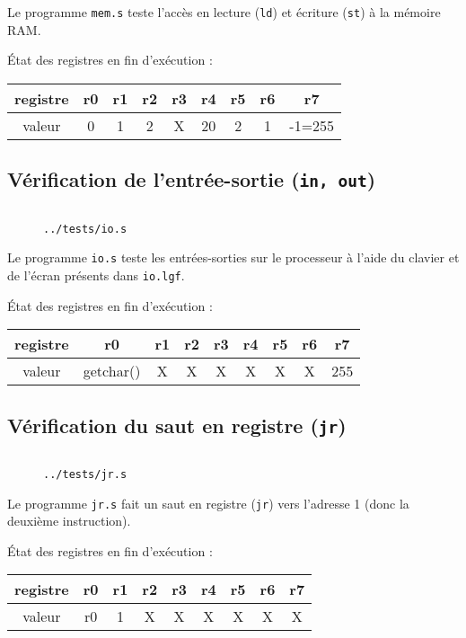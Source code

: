 \documentclass[twoside, 12pt, a4paper]{article}
\newcommand{\fm}[2]{
\begin{figure}[!h]
    \centering
    \inputminted[]{asm}{#1}
    \caption{\texttt{#2}}
\end{figure}
}
\begin{document}
Le programme \texttt{mem.s} teste l'accès en lecture (\texttt{ld}) et écriture (\texttt{st}) à la mémoire RAM.

État des registres en fin d'exécution :
\begin{center}
    \ttfamily
        \begin{tabular}{|c|c|c|c|c|c|c|c|c|} 
         \hline
         registre & r0 & r1 & r2 & r3 & r4 & r5 & r6 & r7 \\
         \hline
         valeur   & 0  & 1  & 2  &  X & 20 & 2 &  1  & -1=255\\
         \hline
    \end{tabular}
\end{center}

\subsection{Vérification de l'entrée-sortie (\texttt{in, out})}

\fm{../tests/io.s}{../tests/io.s}

Le programme \texttt{io.s} teste les entrées-sorties sur le processeur à l'aide du clavier et de l'écran présents dans \texttt{io.lgf}.

État des registres en fin d'exécution :
\begin{center}
    \ttfamily
        \begin{tabular}{|c|c|c|c|c|c|c|c|c|} 
         \hline
         registre & r0 & r1 & r2 & r3 & r4 & r5 & r6 & r7 \\
         \hline
         valeur   & getchar()  & X  & X  &  X & X  & X  &  X & 255\\
         \hline
    \end{tabular}
\end{center}


\subsection{Vérification du saut en registre (\texttt{jr})}

\fm{../tests/jr.s}{../tests/jr.s}

Le programme \texttt{jr.s} fait un saut en registre (\texttt{jr}) vers l'adresse 1 (donc la deuxième instruction).

État des registres en fin d'exécution :
\begin{center}
    \ttfamily
        \begin{tabular}{|c|c|c|c|c|c|c|c|c|} 
         \hline
         registre & r0 & r1 & r2 & r3 & r4 & r5 & r6 & r7 \\
         \hline
         valeur   & r0  & 1  & X  &  X & X  & X  &  X & X\\
         \hline
    \end{tabular}
\end{center}
\end{document}
